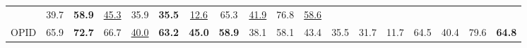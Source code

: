 \begin{table}[ht!]
{\begin{tabular}{l ccccccc cccccccc cc}
        & 39.7 & \cellcolor{topcolor}\textbf{58.9} & \cellcolor{secondcolor}\underline{45.3} & 35.9 & \cellcolor{topcolor}\textbf{35.5} & \cellcolor{secondcolor}\underline{12.6} & 65.3 & \cellcolor{secondcolor}\underline{41.9}
        & 76.8 & \cellcolor{secondcolor}\underline{58.6}
        \\
    OPID
        & 65.9 & \cellcolor{topcolor}\textbf{72.7} & 66.7 & \cellcolor{secondcolor}\underline{40.0} & \cellcolor{topcolor}\textbf{63.2} & \cellcolor{topcolor}\textbf{45.0} & \cellcolor{topcolor}\textbf{58.9}
        & 38.1 & 58.1 & 43.4 & 35.5 & 31.7 & 11.7 & 64.5 & 40.4
        & 79.6 & \cellcolor{topcolor}\textbf{64.8}
        \\

    \bottomrule
    \end{tabular}
    }
\end{table}
